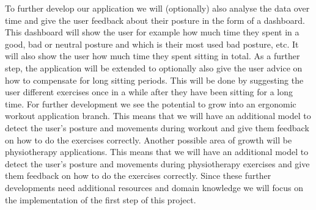 \p
To further develop our application we will (optionally) also analyse the data over time and give the user feedback about their posture 
in the form of a dashboard. This dashboard will show the user for example how much time they spent in a good, bad or neutral posture
and which is their most used bad posture, etc. It will also show the user how much time they spent sitting in total. 
As a further step, the application will be extended to optionally also give the user advice on how to compensate for long sitting periods.
This will be done by suggesting the user different exercises once in a while after they have been sitting for a long time.  
For further development we see the potential to grow into an ergonomic workout application branch. This means that
we will have an additional model to detect the user's posture and movements during workout and give them feedback on how to do the exercises correctly.
Another possible area of growth will be physiotherapy applications. 
This means that we will have an additional model to detect the user's posture and movements
during physiotherapy exercises and give them feedback on how to do the exercises correctly.
Since these further developments need additional resources and domain knowledge we will focus on the implementation
of the first step of this project.